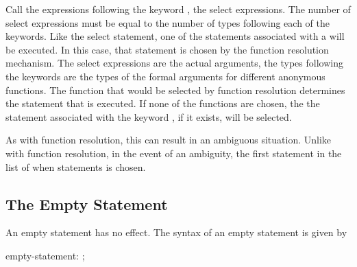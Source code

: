 Call the expressions following the keyword , the select
expressions.  The number of select expressions must be equal to the
number of types following each of the  keywords.  Like the
select statement, one of the statements associated with a 
will be executed.  In this case, that statement is chosen by the
function resolution mechanism.  The select expressions are the actual
arguments, the types following the  keywords are the types
of the formal arguments for different anonymous functions.  The
function that would be selected by function resolution determines the
statement that is executed.  If none of the functions are chosen, the
the statement associated with the keyword , if it
exists, will be selected.

As with function resolution, this can result in an ambiguous
situation.  Unlike with function resolution, in the event of an
ambiguity, the first statement in the list of when statements is
chosen.

\subsection{The Empty Statement}
\label{The_Empty_Statement}

An empty statement has no effect.  The syntax of an empty statement is
given by
\begin{syntax}
empty-statement:
  ;
\end{syntax}
